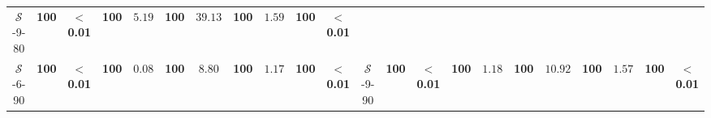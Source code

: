 \begin{table}[t]
{\begin{tabular}{ccccccccccc|ccccccccccc}
            $\mathcal{S}$-9-80 & \textbf{100} & $\mathbf{<}$\textbf{0.01} & \textbf{100} & $5.19$ & \textbf{100} & $39.13$ &  \textbf{100} & $1.59$ & \textbf{100} & $\mathbf{<}$\textbf{0.01} \\
            $\mathcal{S}$-6-90 & \textbf{100} & $\mathbf{<}$\textbf{0.01} & \textbf{100} & $0.08$ & \textbf{100} & $8.80$ & \textbf{100} & $1.17$ & \textbf{100} & $\mathbf{<}$\textbf{0.01} & 
            $\mathcal{S}$-9-90 & \textbf{100} & $\mathbf{<}$\textbf{0.01} & \textbf{100} & $1.18$ & \textbf{100} & $10.92$ &  \textbf{100} & $1.57$ & \textbf{100} & $\mathbf{<}$\textbf{0.01} \\

            \hline
        \end{tabular}
    }
\end{table}

